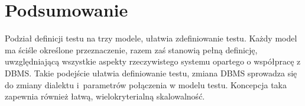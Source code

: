 \section{Podsumowanie}
Podział definicji testu na trzy modele, ułatwia zdefiniowanie testu. Każdy model 
ma ściśle określone przeznaczenie, razem zaś stanowią pełną definicję, 
uwzględniającą wszystkie aspekty rzeczywistego systemu opartego o współpracę z DBMS. 
Takie podejście ułatwia definiowanie testu, zmiana DBMS sprowadza się do zmiany dialektu 
i~parametrów połączenia w modelu testu. Koncepcja taka zapewnia również łatwą, 
wielokryterialną skalowalność.

